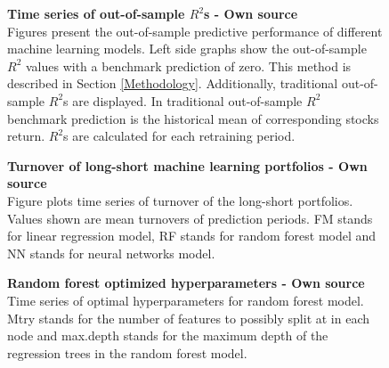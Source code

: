 \documentclass[12pt]{article}
\begin{document}
\begin{figure}[H]
\centering
\caption[Time series of out-of-sample $R^2$]{\textbf{Time series of out-of-sample \boldmath$R^2$s \textnormal{- Own source}}\\ Figures present the out-of-sample predictive performance of different machine learning models. Left side graphs show the out-of-sample $R^2$ values with a benchmark prediction of zero. This method is described in Section \ref{Methodology}. Additionally, traditional out-of-sample $R^2$s are displayed. In traditional out-of-sample $R^2$ benchmark prediction is the historical mean of corresponding stocks return. $R^2$s are calculated for each retraining period.}

\label{plot:OOSR2_ts}
\end{figure}

\begin{figure}[H]
\centering
\caption[Turnover of long-short machine learning portfolios]{\textbf{Turnover of long-short machine learning portfolios \textnormal{- Own source}}\\ Figure plots time series of turnover of the long-short portfolios. Values shown are mean turnovers of prediction periods. FM stands for linear regression model, RF stands for random forest model and NN stands for neural networks model. }

\label{plot:Turnover}
\end{figure}

\begin{figure}[H]
\centering
\caption[Optimized random forest hyperparameters]{\textbf{Random forest optimized hyperparameters \textnormal{- Own source}}\\ Time series of optimal hyperparameters for random forest model. Mtry stands for the number of features to possibly split at in each node and max.depth stands for the maximum depth of the regression trees in the random forest model.}

\label{plot:RFHyperParams}
\end{figure}

\clearpage



\end{document}
